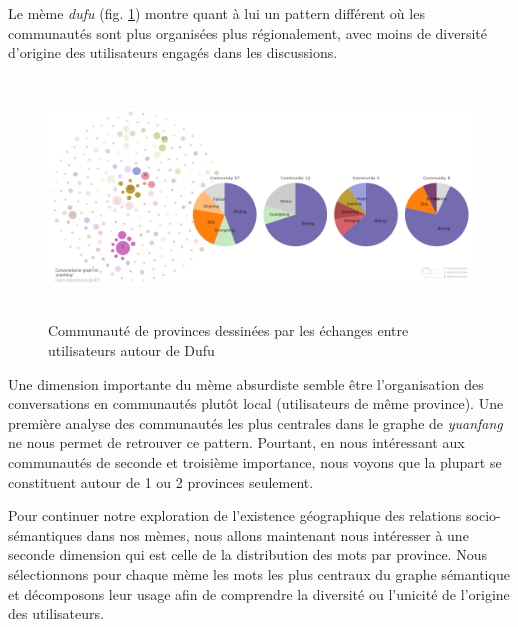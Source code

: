 Le m\`eme \textit{dufu} (fig. \ref{fig:dufu-users-pie}) montre quant \`a lui un pattern diff\'erent o\`u les communaut\'es sont plus organis\'ees plus r\'egionalement, avec moins de diversit\'e d{\textquoteright}origine des utilisateurs engag\'es dans les discussions.

\begin{figure}
    \centering
    \includegraphics[width=5.9996in,height=2.5004in]{figures/chap4/chapitre4-img58.png}
    \caption{
        Communaut\'e de provinces dessin\'ees par les \'echanges entre utilisateurs autour de Dufu
    }
    \label{fig:dufu-users-pie}
\end{figure}


Une dimension importante du m\`eme absurdiste semble \^etre l{\textquoteright}organisation des conversations en communaut\'es plut\^ot local (utilisateurs de m\^eme province). Une premi\`ere analyse des communaut\'es les plus centrales dans le graphe de \textit{yuanfang} ne nous permet de retrouver ce pattern. Pourtant, en nous int\'eressant aux communaut\'es de seconde et troisi\`eme importance, nous voyons que la plupart se constituent autour de 1 ou 2 provinces seulement.  

Pour continuer notre exploration de l{\textquoteright}existence g\'eographique des relations socio-s\'emantiques dans nos m\`emes, nous allons maintenant nous int\'eresser \`a une seconde dimension qui est celle de la distribution des mots par province. Nous s\'electionnons pour chaque m\`eme les mots les plus centraux du graphe s\'emantique et d\'ecomposons leur usage afin de comprendre la diversit\'e ou l{\textquoteright}unicit\'e de l{\textquoteright}origine des utilisateurs. 

